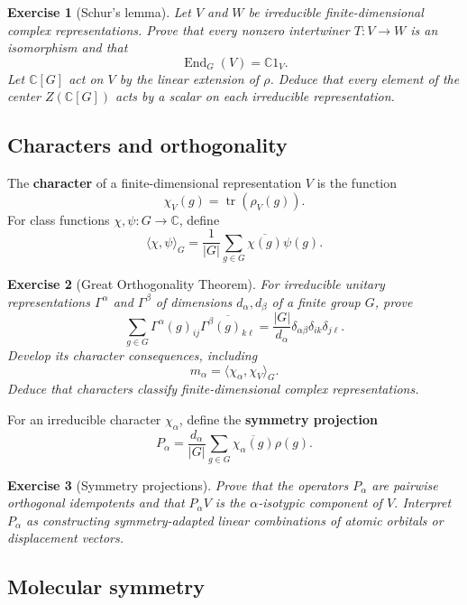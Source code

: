 \documentclass{article}
\newtheorem{exercise}{Exercise}
\newcommand{\trace}{\operatorname{tr}}
\newcommand{\End}{\operatorname{End}}
\begin{document}
\begin{exercise}[Schur's lemma]\leavevmode\par
\textit{Let $V$ and $W$ be irreducible finite-dimensional complex representations. Prove that every nonzero intertwiner $T:V\to W$ is an isomorphism and that}
\[
\End_G(V)=\mathbb C1_V.
\]
\textit{Let $\mathbb C[G]$ act on $V$ by the linear extension of $\rho$. Deduce that every element of the center $Z(\mathbb C[G])$ acts by a scalar on each irreducible representation.}
\end{exercise}

\subsection{Characters and orthogonality}

The \textbf{character} of a finite-dimensional representation $V$ is the function
\[
\chi_V(g)=\trace(\rho_V(g)).
\]
For class functions $\chi,\psi:G\to\mathbb C$, define
\[
\langle\chi,\psi\rangle_G
=\frac1{|G|}\sum_{g\in G}\overline{\chi(g)}\psi(g).
\]

\begin{exercise}[Great Orthogonality Theorem]\leavevmode\par
\textit{For irreducible unitary representations $\Gamma^\alpha$ and
$\Gamma^\beta$ of dimensions $d_\alpha,d_\beta$ of a finite group $G$,
prove}
\[
\sum_{g\in G}
\Gamma^\alpha(g)_{ij}
\overline{\Gamma^\beta(g)_{k\ell}}
=\frac{|G|}{d_\alpha}
\delta_{\alpha\beta}\delta_{ik}\delta_{j\ell}.
\]
\textit{Develop its character consequences, including}
\[
m_\alpha=\langle\chi_\alpha,\chi_V\rangle_G.
\]
\textit{Deduce that characters classify finite-dimensional complex
representations.}
\end{exercise}

For an irreducible character $\chi_\alpha$, define the \textbf{symmetry projection}
\[
P_\alpha
=\frac{d_\alpha}{|G|}
\sum_{g\in G}\overline{\chi_\alpha(g)}\rho(g).
\]

\begin{exercise}[Symmetry projections]\leavevmode\par
\textit{Prove that the operators $P_\alpha$ are pairwise orthogonal idempotents and that $P_\alpha V$ is the $\alpha$-isotypic component of $V$. Interpret $P_\alpha$ as constructing symmetry-adapted linear combinations of atomic orbitals or displacement vectors.}
\end{exercise}

\subsection{Molecular symmetry}
\end{document}

